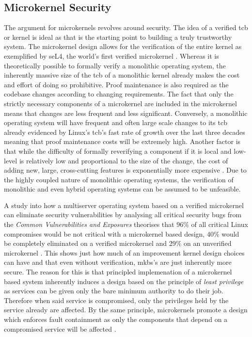 \documentclass[../thesis.tex]{subfiles}
\begin{document}
\subsection{Microkernel Security}
The argument for microkernels revolves around security. The idea of a verified \gls{tcb} or kernel is ideal as that is the starting point to building a truly trustworthy system. The microkernel design allows for the verification of the entire kernel as exemplified by seL4, the world's first verified microkernel \citep{Klein_AEHCDEEKNSTW_10}. Whereas it is theoretically possible to formally verify a monolithic operating system, the inherently massive size of the \gls{tcb} of a monolithic kernel already makes the cost and effort of doing so prohibitive. Proof maintenance is also required as the codebase changes according to changing requirements. The fact that only the strictly necessary components of a microkernel are included in the microkernel means that changes are less frequent and less significant. Conversely, a monolithic operating system will have frequent and often large scale changes to its \gls{tcb} already evidenced by Linux's \gls{tcb}'s fast rate of growth over the last three decades meaning that proof maintenance costs will be extremely high. Another factor is that while the difficulty of formally reverifying a component if it is local and low-level is relatively low and proportional to the size of the change, the cost of adding new, large, cross-cutting features is exponentially more expensive \citep{Klein_AEHCDEEKNSTW_10}. Due to the highly coupled nature of monolithic operating systems, the verification of monolithic and even hybrid operating systems can be assumed to be unfeasible. 

A study into how a multiserver operating system based on a verified microkernel can eliminate security vulnerabilities by analysing all critical security bugs from the \textit{Common Vulnerabilities and Exposures} theorises that 96\% of all critical Linux compromises would be not critical with a microkernel based design, 40\% would be completely eliminated on a verified microkernel and 29\% on an unverified microkernel \citep{Biggs_LH_18}. This shows just how much of an improvement kernel design choices can have and that even without verification, \gls{mkbs}'s are just inherently more secure. The reason for this is that principled implemenation of a microkernel based system inherently induces a design based on the principle of \textit{least privilege} \citep{Saltzer_Schroeder_75} as services can be given only the bare minimum authority to do their job. Therefore when said service is compromised, only the privileges held by the service already are affected. By the same principle, microkernels promote a design which enforces fault containment as only the components that depend on a compromised service will be affected \citep{Biggs_LH_18}.
\end{document}
